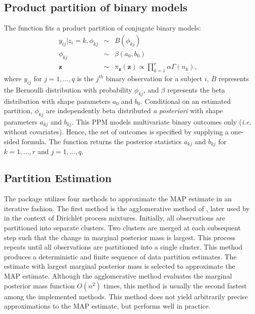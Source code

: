 \documentclass[article, nojss]{jss}
\newcommand{\bz}{\boldsymbol{z}}
\begin{document}
\subsection{Product partition of binary models}

The  function fits a product partition of conjugate binary models:
\begin{eqnarray}
y_{ij} | z_i = k, \phi_{kj} & \sim & B(\phi_{kj}) \nonumber \\
\phi_{kj} & \sim & \beta(a_0, b_0) \nonumber \\
\bz & \sim & \pi_{\bz}(\bz) \propto \prod_{k=1}^r \alpha \Gamma(n_k),
\end{eqnarray}
where $y_{ij}$ for $j = 1,\ldots,q$ is the $j^{th}$ binary observation for a subject $i$, $B$ represents the Bernoulli distribution with probability $\phi_{kj}$, and $\beta$ represents the beta distribution with shape parameters $a_0$ and $b_0$. Conditional on an estimated partition, $\phi_{kj}$ are independently beta distributed {\it a posteriori} with shape parameters $a_{kj}$ and $b_{kj}$. This PPM models multivariate binary outcomes only ({\it i.e.} without covariates). Hence, the set of outcomes is specified by supplying a one-sided  formula. The  function returns the posterior statistics $a_{kj}$ and $b_{kj}$ for $k=1,\ldots,r$ and $j=1,\ldots,q$.


\subsection[Estimation]{Partition Estimation} \label{Estimation}
The  package utilizes four methods to approximate the MAP estimate in an iterative fashion. The first method is the agglomerative method of \citet{Ward1963}, later used by \citet{Heard2005} in the context of Dirichlet process mixtures. Initially, all observations are partitioned into separate clusters. Two clusters are merged at each subsequent step such that the change in marginal posterior mass is largest. This process repeats until all observations are partitioned into a single cluster. This method produces a deterministic and finite sequence of data partition estimates. The estimate with largest marginal posterior mass is selected to approximate the MAP estimate. Although the agglomerative method evaluates the marginal posterior mass function $O(n^2)$ times, this method is usually the second fastest among the implemented methods. This method does not yield arbitrarily precise approximations to the MAP estimate, but performs well in practice.
\end{document}
